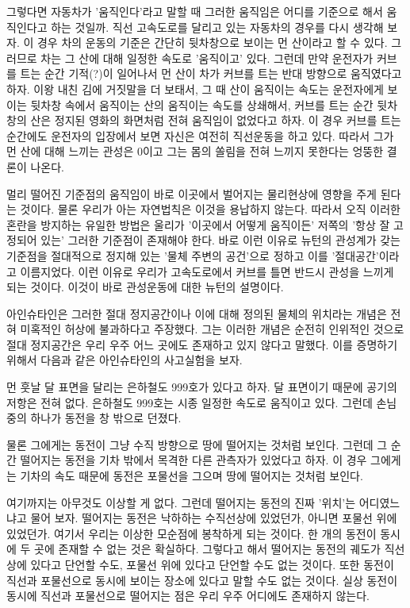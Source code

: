 그렇다면 자동차가 '움직인다'라고 말할 때 그러한 움직임은 어디를 기준으로 해서 움직인다고
하는 것일까. 직선 고속도로를 달리고 있는 자동차의 경우를 다시 생각해 보자. 이 경우 차의
운동의 기준은 간단히 뒷차창으로 보이는 먼 산이라고 할 수 있다. 그러므로 차는 그 산에 대해
일정한 속도로 '움직이고' 있다. 그런데 만약 운전자가 커브를 트는 순간 기적(?)이 일어나서 먼
산이 차가 커브를 트는 반대 방향으로 움직였다고 하자. 이왕 내친 김에 거짓말을 더 보태서, 그
때 산이 움직이는 속도는 운전자에게 보이는 뒷차창 속에서 움직이는 산의 움직이는  속도를
상쇄해서, 커브를 트는 순간 뒷차창의 산은 정지된 영화의 화면처럼 전혀 움직임이 없었다고
하자. 이 경우 커브를 트는 순간에도 운전자의 입장에서 보면 자신은 여전히 직선운동을 하고
있다. 따라서 그가 먼 산에 대해 느끼는 관성은 0이고 그는 몸의 쏠림을 전혀 느끼지 못한다는
엉뚱한 결론이 나온다.

멀리 떨어진 기준점의 움직임이 바로 이곳에서 벌어지는 물리현상에 영향을 주게 된다는
것이다. 물론 우리가 아는 자연법칙은 이것을 용납하지 않는다. 따라서 오직 이러한 혼란을
방지하는 유일한 방법은 울리가 '이곳에서 어떻게 움직이든' 저쪽의 '항상 잘 고정되어 있는'
그러한 기준점이 존재해야 한다. 바로 이런 이유로 뉴턴의 관성계가 갖는 기준점을 절대적으로
정지해 있는 '물체 주변의 공건'으로 정하고 이를 '절대공간'이라고 이름지었다. 이런 이유로
우리가 고속도로에서 커브를 틀면 반드시 관성을  느끼게 되는 것이다. 이것이 바로 관성운동에
대한 뉴턴의 설명이다.

아인슈타인은 그러한 절대 정지공간이나 이에 대해 정의된 물체의 위치라는 개념은 전혀
미혹적인 허상에 불과하다고 주장했다. 그는 이러한 개념은 순전히 인위적인 것으로 절대
정지공간은  우리 우주 어느 곳에도 존재하고 있지 않다고 말했다. 이를 증명하기 위해서 다음과
같은 아인슈타인의 사고실험을 보자.

먼 훗날 달 표면을 달리는 은하철도 999호가 있다고 하자. 달 표면이기 때문에 공기의 저항은
전혀 없다. 은하철도 999호는 시종  일정한 속도로 움직이고  있다. 그런데 손님 중의 하나가
동전을 창 밖으로 던졌다.

물론 그에게는 동전이 그냥 수직 방향으로 땅에 떨어지는 것처럼 보인다. 그런데 그 순간
떨어지는 동전을 기차 밖에서 목격한 다른 관측자가 있었다고 하자. 이 경우 그에게는 기차의
속도 때문에 동전은 포물선을 그으며 땅에 떨어지는 것처럼 보인다.

여기까지는 아무것도 이상할 게 없다. 그런데 떨어지는 동전의 진짜 '위치'는 어디였느냐고
물어 보자. 떨어지는 동전은 낙하하는 수직선상에 있었던가, 아니면 포물선 위에 있었던가.
여기서  우리는 이상한 모순점에 봉착하게 되는 것이다. 한 개의 동전이 동시에 두 곳에 존재할
수 없는 것은 확실하다. 그렇다고 해서 떨어지는 동전의 궤도가 직선상에 있다고 단언할 수도,
포물선 위에 있다고 단언할 수도 없는 것이다. 또한 동전이 직선과 포물선으로 동시에 보이는
장소에 있다고 말할 수도 없는 것이다. 실상 동전이 동시에 직선과 포물선으로 떨어지는 점은
우리 우주 어디에도 존재하지 않는다.


